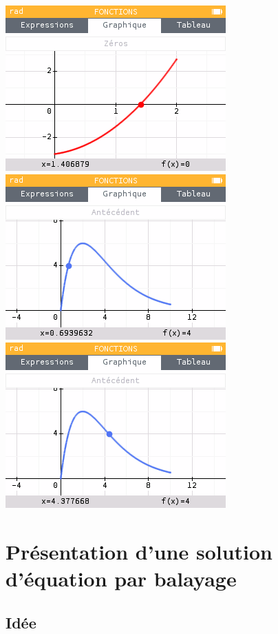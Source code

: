 \documentclass[a4paper,french,11pt]{article}
\begin{document}
\begin{codetex}[]
\hfill\includegraphics[scale=0.45]{./graphics/pl-solve_b}~~
\includegraphics[scale=0.45]{./graphics/pl-solve_c}~~
\includegraphics[scale=0.45]{./graphics/pl-solve_d}\hfill~
\end{codetex}

\newpage

\section{Présentation d'une solution d'équation par balayage}\label{solutiontvi}

\subsection{Idée}
\end{document}
